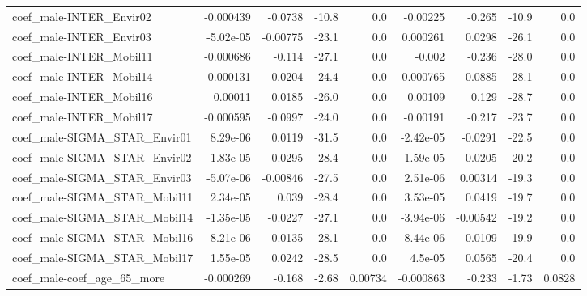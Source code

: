 \begin{tabular}{lrrrrrrrr}
coef\_male-INTER\_Envir02                   &   -0.000439 &      -0.0738 &   -10.8 &      0.0 &   -0.00225 &      -0.265 &        -10.9 &           0.0 \\
coef\_male-INTER\_Envir03                   &   -5.02e-05 &     -0.00775 &   -23.1 &      0.0 &   0.000261 &      0.0298 &        -26.1 &           0.0 \\
coef\_male-INTER\_Mobil11                   &   -0.000686 &       -0.114 &   -27.1 &      0.0 &     -0.002 &      -0.236 &        -28.0 &           0.0 \\
coef\_male-INTER\_Mobil14                   &    0.000131 &       0.0204 &   -24.4 &      0.0 &   0.000765 &      0.0885 &        -28.1 &           0.0 \\
coef\_male-INTER\_Mobil16                   &     0.00011 &       0.0185 &   -26.0 &      0.0 &    0.00109 &       0.129 &        -28.7 &           0.0 \\
coef\_male-INTER\_Mobil17                   &   -0.000595 &      -0.0997 &   -24.0 &      0.0 &   -0.00191 &      -0.217 &        -23.7 &           0.0 \\
coef\_male-SIGMA\_STAR\_Envir01              &    8.29e-06 &       0.0119 &   -31.5 &      0.0 &  -2.42e-05 &     -0.0291 &        -22.5 &           0.0 \\
coef\_male-SIGMA\_STAR\_Envir02              &   -1.83e-05 &      -0.0295 &   -28.4 &      0.0 &  -1.59e-05 &     -0.0205 &        -20.2 &           0.0 \\
coef\_male-SIGMA\_STAR\_Envir03              &   -5.07e-06 &     -0.00846 &   -27.5 &      0.0 &   2.51e-06 &     0.00314 &        -19.3 &           0.0 \\
coef\_male-SIGMA\_STAR\_Mobil11              &    2.34e-05 &        0.039 &   -28.4 &      0.0 &   3.53e-05 &      0.0419 &        -19.7 &           0.0 \\
coef\_male-SIGMA\_STAR\_Mobil14              &   -1.35e-05 &      -0.0227 &   -27.1 &      0.0 &  -3.94e-06 &    -0.00542 &        -19.2 &           0.0 \\
coef\_male-SIGMA\_STAR\_Mobil16              &   -8.21e-06 &      -0.0135 &   -28.1 &      0.0 &  -8.44e-06 &     -0.0109 &        -19.9 &           0.0 \\
coef\_male-SIGMA\_STAR\_Mobil17              &    1.55e-05 &       0.0242 &   -28.5 &      0.0 &    4.5e-05 &      0.0565 &        -20.4 &           0.0 \\
coef\_male-coef\_age\_65\_more                &   -0.000269 &       -0.168 &   -2.68 &  0.00734 &  -0.000863 &      -0.233 &        -1.73 &        0.0828 \\

\end{tabular}
